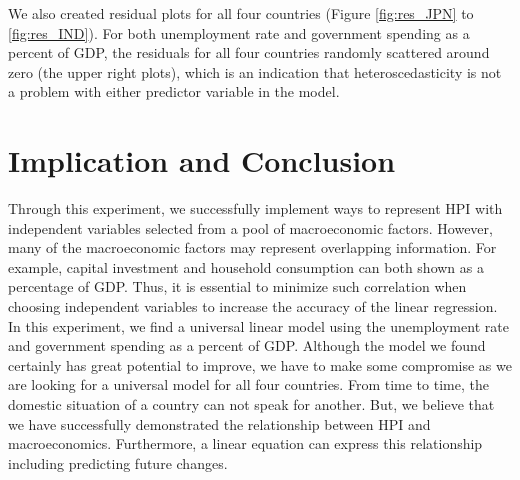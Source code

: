 \documentclass[11pt]{article}
\begin{document}
We also created residual plots for all four countries (Figure \ref{fig:res_JPN} to \ref{fig:res_IND}). For both unemployment rate and government spending as a percent of GDP, the residuals for all four countries randomly scattered around zero (the upper right plots), which is an indication that heteroscedasticity is not a problem with either predictor variable in the model\citep{Residual1}.

\section{Implication and Conclusion}\label{conclusion}
Through this experiment, we successfully implement ways to represent HPI with independent variables selected from a pool of macroeconomic factors. However, many of the macroeconomic factors may represent overlapping information. For example, capital investment and household consumption can both shown as a percentage of GDP. Thus, it is essential to minimize such correlation when choosing independent variables to increase the accuracy of the linear regression. In this experiment, we find a universal linear model using the unemployment rate and government spending as a percent of GDP. Although the model we found certainly has great potential to improve, we have to make some compromise as we are looking for a universal model for all four countries. From time to time, the domestic situation of a country can not speak for another. But, we believe that we have successfully demonstrated the relationship between HPI and macroeconomics. Furthermore, a linear equation can express this relationship including predicting future changes. 

\newpage


\end{document}
